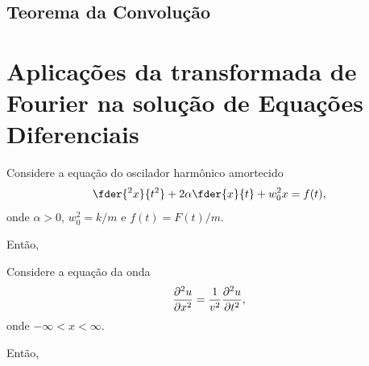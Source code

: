 \subsection{Teorema da Convolução}

\section{Aplicações da transformada de Fourier na solução de Equações
Diferenciais}
\begin{exem}
  Considere a equação do oscilador harmônico amortecido
  \begin{dmath*}
    \fder{^2 x}{t^2} + 2 \alpha \fder{x}{t} + w_0^2 x = f(t),
  \end{dmath*}
  onde $\alpha > 0$, $w_0^2 = k / m$ e $f(t) = F(t) / m$.

  Então,
\end{exem}

\begin{exem}
  Considere a equação da onda
  \begin{dmath*}
    \pder{^2 u}{x^2} = \frac{1}{v^2} \pder{^2 u}{t^2},
  \end{dmath*}
  onde $-\infty < x < \infty$.

  Então,
\end{exem}

